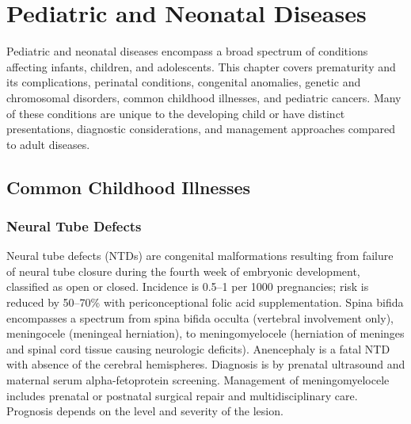 \chapter{Pediatric and Neonatal Diseases}
\label{ch:pediatric}
Pediatric and neonatal diseases encompass a broad spectrum of conditions affecting infants, children, and adolescents. This chapter covers prematurity and its complications, perinatal conditions, congenital anomalies, genetic and chromosomal disorders, common childhood illnesses, and pediatric cancers. Many of these conditions are unique to the developing child or have distinct presentations, diagnostic considerations, and management approaches compared to adult diseases.

\section{Common Childhood Illnesses}








\label{sec:Common Childhood Illnesses}

\subsection{Neural Tube Defects}
\label{sec:Neural Tube Defects}
Neural tube defects (NTDs) are congenital malformations resulting from failure of neural tube closure during the fourth week of embryonic development, classified as open or closed. Incidence is 0.5--1 per 1000 pregnancies; risk is reduced by 50--70\% with periconceptional folic acid supplementation. Spina bifida encompasses a spectrum from spina bifida occulta (vertebral involvement only), meningocele (meningeal herniation), to meningomyelocele (herniation of meninges and spinal cord tissue causing neurologic deficits). Anencephaly is a fatal NTD with absence of the cerebral hemispheres. Diagnosis is by prenatal ultrasound and maternal serum alpha-fetoprotein screening. Management of meningomyelocele includes prenatal or postnatal surgical repair and multidisciplinary care. Prognosis depends on the level and severity of the lesion.

